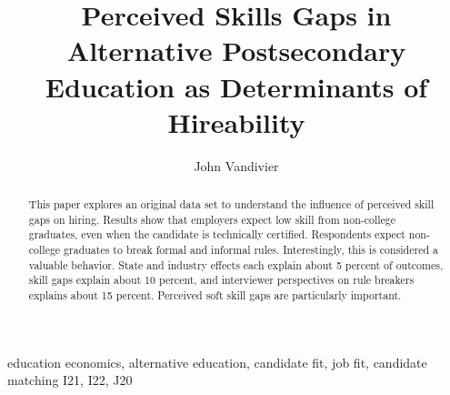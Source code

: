\documentclass[review]{elsarticle}
\begin{document}
\begin{frontmatter}

    \title{
        Perceived Skills Gaps in Alternative Postsecondary Education as Determinants of Hireability
    }

    \author[mymainaddress]{John Vandivier}
    \address[mymainaddress]{4400 University Dr, Fairfax, VA 22030}

    \begin{abstract}




        This paper explores an original data set
        to understand the influence of perceived skill gaps on hiring.
        Results show that employers expect low skill from non-college graduates,
        even when the candidate is technically certified.
        Respondents expect non-college graduates to break formal and informal rules.
        Interestingly, this is considered a valuable behavior.
        State and industry effects each explain about 5 percent of outcomes,
        skill gaps explain about 10 percent,
        and interviewer perspectives on rule breakers explains about 15 percent.
        Perceived soft skill gaps are particularly important.
    \end{abstract}

    \begin{keyword}
        education economics, alternative education, candidate fit, job fit, candidate matching     %
        \MSC[2010] I21, I22, J20                                                                   %
    \end{keyword}

\end{frontmatter}
\end{document}

